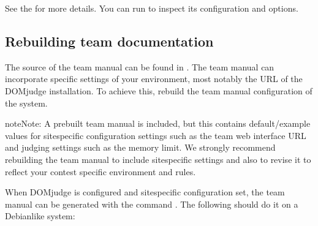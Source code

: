 \documentclass[a4paper,10pt,english,openany]{sphinxmanual}
\begin{document}
\begin{sphinxVerbatim}[commandchars=\\\{\}]
     
\end{sphinxVerbatim}

\sphinxAtStartPar
See the  for more details. You can run 
to inspect its configuration and options.


\subsection{Rebuilding team documentation}
\label{\detokenize{install-workstation:rebuilding-team-documentation}}
\sphinxAtStartPar
The source of the team manual can be found in .
The team manual can incorporate specific settings of your environment,
most notably the URL of the DOMjudge installation. To achieve this,
rebuild the team manual  configuration of the system.

\begin{sphinxadmonition}{note}{Note:}
\sphinxAtStartPar
A prebuilt team manual is included, but this contains
default/example values for site\sphinxhyphen{}specific configuration settings such
as the team web interface URL and judging settings such as the memory
limit. We strongly recommend rebuilding the team manual to include
site\sphinxhyphen{}specific settings and also to revise it to reflect your contest
specific environment and rules.
\end{sphinxadmonition}

\sphinxAtStartPar
When DOMjudge is configured and site\sphinxhyphen{}specific configuration set,
the team manual can be generated with the command .
The following should do it on a Debian\sphinxhyphen{}like system:

\begin{sphinxVerbatim}[commandchars=\\\{\}]
       
 
 
\end{sphinxVerbatim}
\end{document}
